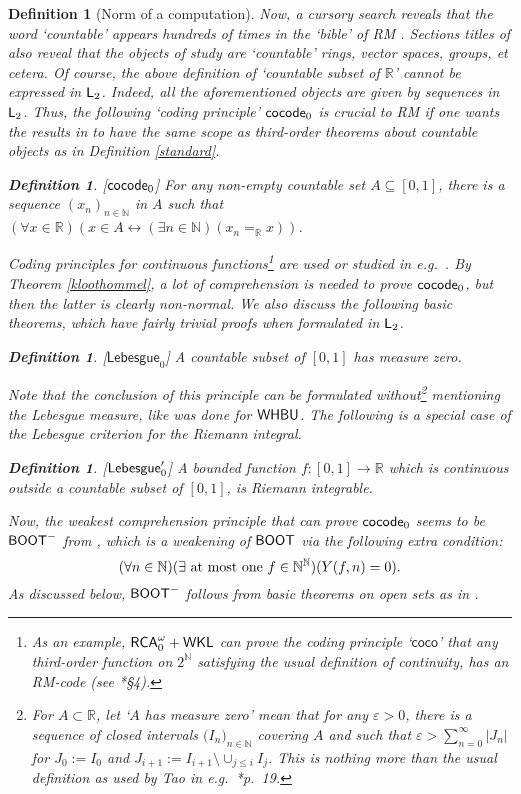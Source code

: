 \documentclass[reqno]{amsart}
\newtheorem{defi}[thm]{Definition}
\def\bdefi{\begin{defi}\rm}
\def\edefi{\end{defi}}
\def\RCAo{\textup{\textsf{RCA}}_{0}^{\omega}}
\def\WKL{\textup{\textsf{WKL}}}
\def\N{{\mathbb  N}}
\def\R{{\mathbb  R}}
\def\L{\textsf{\textup{L}}}
\def\di{\rightarrow}
\def\asa{\leftrightarrow}
\def\LEB{\textup{\textsf{Lebesgue}}}
\def\cocode{\textup{\textsf{cocode}}}
\def\BOOT{\textup{\textsf{BOOT}}}
\def\WHBU{\textup{\textsf{WHBU}}}
\def\eps{\varepsilon}
\numberwithin{equation}{section}
\numberwithin{thm}{section}
\begin{document}
\begin{defi}[Norm of a computation]
Now, a cursory search reveals that the word `countable' appears hundreds of times in the `bible' of RM \cite{simpson2}.  
Sections titles of \cite{simpson2} also reveal that the objects of study are `countable' rings, vector spaces, groups, et cetera.  
Of course, the above definition of `countable subset of $\R$' cannot be expressed in $\L_{2}$.  Indeed, all the 
aforementioned objects are given by \emph{sequences} in $\L_{2}$.  
Thus, the following `coding principle' $\cocode_{0}$ is \emph{crucial} to RM \emph{if} one wants the results in \cite{simpson2} to have the same scope 
as third-order theorems about countable objects as in Definition \ref{standard}.  
\bdefi[$\cocode_{0}$]
For any non-empty countable set $A\subseteq [0,1]$, there is a sequence $(x_{n})_{n\in \N}$ in $A$ such that $(\forall x\in \R)(x\in A\asa (\exists n\in \N)(x_{n}=_{\R}x))$.
\edefi
Coding principles for continuous functions\footnote{As an example, $\RCAo+\WKL$ can prove the coding principle `$\textsf{coco}$' that any third-order function on $2^{\N}$ satisfying the usual definition of continuity, has an RM-code (see \cite{kohlenbach4}*{\S4}).} are used or studied in e.g.\ \cites{samrep, kohlenbach4, dagsamVII}.
By Theorem \ref{kloothommel}, a lot of comprehension is needed to prove $\cocode_{0}$, but then the latter is clearly non-normal.
We also discuss the following basic theorems, which have fairly trivial proofs when formulated in $\L_{2}$.  
\bdefi[$\textsf{Lebesgue}_{0}$]
A countable subset of $[0,1]$ has measure zero.
\edefi
Note that the conclusion of this principle can be formulated without\footnote{For $A\subset \R$, let `$A$ has measure zero' mean that for any $\eps>0$, there is a sequence of closed intervals $\big(I_{n}\big)_{n\in \N}$ covering $A$ and such that $\eps >\sum^{\infty}_{n=0 }|J_{n}|$ for $J_{0}:= I_{0}$ and $J_{i+1}:= I_{i+1}\setminus \cup_{j\leq i}I_{j}$.  This is nothing more than the usual definition as used by Tao in e.g.\ \cite{taomes}*{p.\ 19}.\label{clukker}} mentioning the Lebesgue measure, like was done for $\WHBU$.  The following is a special case of the Lebesgue criterion for the Riemann integral.   
\bdefi[$\LEB_{0}'$]
A bounded function $f:[0,1]\di \R$ which is continuous outside a countable subset of $[0,1]$, is Riemann integrable. 
\edefi
Now, the weakest comprehension principle that can prove $\cocode_{0}$ seems to be $\BOOT^{-}$ from \cite{dagsamVII}, which is a weakening of $\BOOT$ via the following extra condition:
\[
(\forall n\in \N)(\exists \textup{ at most one } f\in \N^{\N})(Y(f, n)=0).
\]
As discussed below, $\BOOT^{-}$ follows from basic theorems on open sets as in \cite{dagsamVII}. 

\end{defi}
\end{document}
